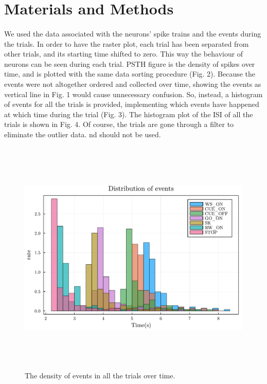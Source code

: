 \documentclass[9pt,twocolumn]{paper-template}
\begin{document}
\section*{Materials and Methods}
\paragraph*{}
We used the data associated with the neurons' spike trains and the events during the trials. In order to have the raster plot, each trial has been separated from other trials, and its starting time shifted to zero. This way the behaviour of neurons can be seen during each trial. PSTH figure is the density of spikes over time, and is plotted with the same data sorting procedure (Fig. 2). Because the events were not altogether ordered and collected over time, showing the events as vertical line in Fig. 1 would cause unnecessary confusion. So, instead, a histogram of events for all the trials is provided, implementing which events have happened at which time during the trial (Fig. 3). The histogram plot of the ISI of all the trials is shown in Fig. 4. Of course, the trials are gone through a filter to eliminate the outlier data.
nd should not be used.

\begin{figure}
\centering
\includegraphics[width=12cm,height=11.4cm]{EvDist.pdf}
\caption{The density of events in all the trials over time.}\label{fig:side}
\end{figure}
\end{document}
